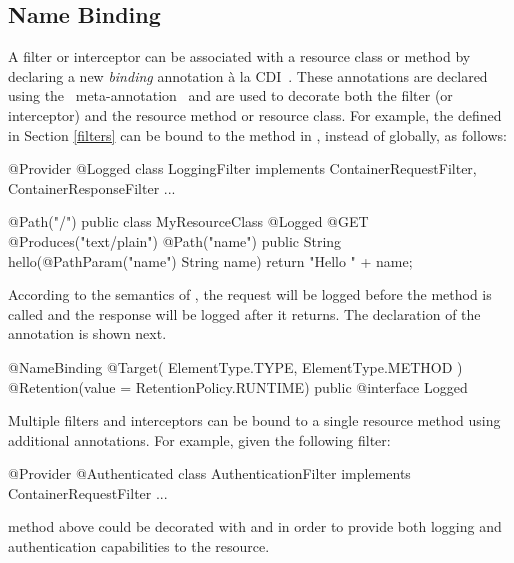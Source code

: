 \subsection{Name Binding}
\label{Name_Binding}

A filter or interceptor can be associated with a resource class or method by declaring a new \emph{binding} annotation \`{a} la CDI~\cite{jsr299}. These annotations are declared using the \jaxrs\ meta-annotation \NameBinding\ and are used to decorate both the filter (or interceptor) and the resource method or resource class. For example, the  defined in Section \ref{filters} can be bound to the method  in , instead of globally, as follows:

\begin{listing}{1}
@Provider
@Logged
class LoggingFilter implements ContainerRequestFilter, 
                               ContainerResponseFilter {
    ...
}
\end{listing}

\begin{listing}{1}
@Path("/")
public class MyResourceClass {
    @Logged
    @GET
    @Produces("text/plain")
    @Path("{name}")
    public String hello(@PathParam("name") String name) {
        return "Hello " + name;
    }
}
\end{listing}

According to the semantics of , the request will be logged before the  method is called and the response will be logged after it returns. The declaration of the  annotation is shown next.

\begin{listing}{1}
@NameBinding
@Target({ ElementType.TYPE, ElementType.METHOD })
@Retention(value = RetentionPolicy.RUNTIME)
public @interface Logged { }
\end{listing}

Multiple filters and interceptors can be bound to a single resource method using additional annotations. For example, given the following filter:

\begin{listing}{1}
@Provider
@Authenticated
class AuthenticationFilter implements ContainerRequestFilter {
    ...
}
\end{listing}

method  above could be decorated with  and  in order to provide both logging and authentication capabilities to the resource.

